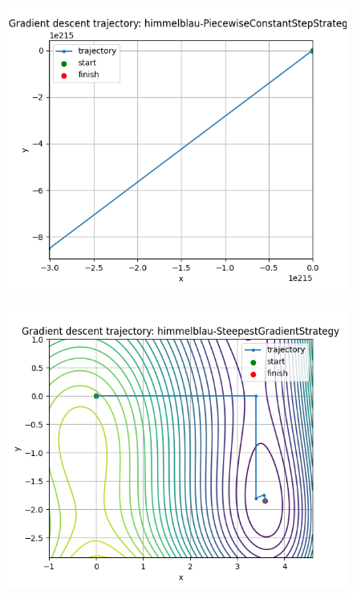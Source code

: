 \documentclass{article}
\begin{document}
\begin{figure}[H]
    \centering
    \includegraphics[width=1\linewidth]{himmelblau-PiecewiseConstantStepStrategy.png}
    \label{fig:enter-label}
\end{figure}
\begin{figure}[H]
    \centering
    \includegraphics[width=1\linewidth]{himmelblau-SteepestGradientStrategy.png}
    \label{fig:enter-label}
\end{figure}
\end{document}
